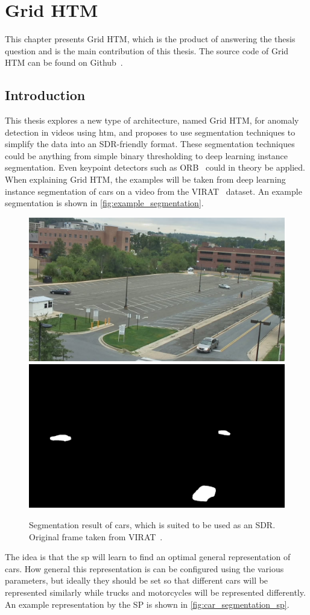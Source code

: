 \chapter{Grid HTM}
\label{sec:grid_htm}
This chapter presents Grid HTM, which is the product of answering the thesis question and is the main contribution of this thesis. The source code of Grid HTM can be found on Github~\cite{master_thesis_github}.
\section{Introduction}
\par
This thesis explores a new type of architecture, named Grid HTM, for anomaly detection in videos using \gls*{htm}, and proposes to use segmentation techniques to simplify the data into an SDR-friendly format. These segmentation techniques could be anything from simple binary thresholding to deep learning instance segmentation. Even keypoint detectors such as ORB~\cite{orb_detector} could in theory be applied. When explaining Grid HTM, the examples will be taken from deep learning instance segmentation of cars on a video from the VIRAT~\cite{VIRAT} dataset. An example segmentation is shown in \autoref{fig:example_segmentation}.
\begin{figure}[H]
    \centering
    \includegraphics[width=.45\textwidth]{resources/methodology/original.png}
    \includegraphics[width=.45\textwidth]{resources/methodology/car_segmentation.png}
    \caption[Segmentation Result of Cars]{Segmentation result of cars, which is suited to be used as an SDR. Original frame taken from VIRAT~\cite{VIRAT}.}
    \label{fig:example_segmentation}
\end{figure}
The idea is that the \gls*{sp} will learn to find an optimal general representation of cars. How general this representation is can be configured using the various parameters, but ideally they should be set so that different cars will be represented similarly while trucks and motorcycles will be represented differently. An example representation by the SP is shown in \autoref{fig:car_segmentation_sp}.
